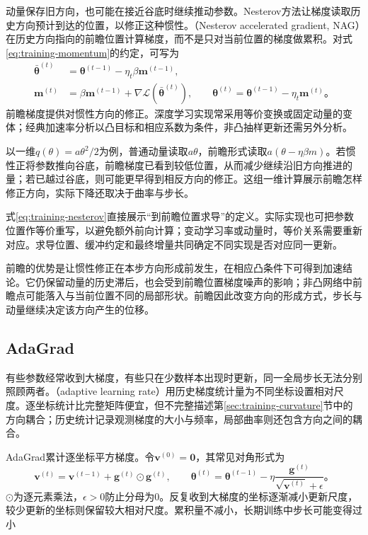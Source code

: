 动量保存旧方向，也可能在接近谷底时继续推动参数。Nesterov方法让梯度读取历史方向预计到达的位置，以修正这种惯性。（Nesterov accelerated gradient, NAG）在历史方向指向的前瞻位置计算梯度，而不是只对当前位置的梯度做累积。对式\eqref{eq:training-momentum}的约定，可写为
\begin{align}
  \bar{\bm\theta}^{(t)}&=\bm\theta^{(t-1)}-\eta_t\beta\bm m^{(t-1)},\\
  \bm m^{(t)}&=\beta\bm m^{(t-1)}+
       \nabla\mathcal L(\bar{\bm\theta}^{(t)}),\qquad
  \bm\theta^{(t)}=\bm\theta^{(t-1)}-\eta_t\bm m^{(t)}\text{。}
  \label{eq:training-nesterov}
\end{align}
前瞻梯度提供对惯性方向的修正。深度学习实现常采用等价变换或固定动量的变体；经典加速率分析以凸目标和相应系数为条件，非凸抽样更新还需另外分析。

以一维$q(\theta)=a\theta^2/2$为例，普通动量读取$a\theta$，前瞻形式读取$a(\theta-\eta\beta m)$。若惯性正将参数推向谷底，前瞻梯度已看到较低位置，从而减少继续沿旧方向推进的量；若已越过谷底，则可能更早得到相反方向的修正。这组一维计算展示前瞻怎样修正方向，实际下降还取决于曲率与步长。

式\eqref{eq:training-nesterov}直接展示“到前瞻位置求导”的定义。实际实现也可把参数位置作等价重写，以避免额外前向计算；变动学习率或动量时，等价关系需要重新对应。求导位置、缓冲约定和最终增量共同确定不同实现是否对应同一更新。

前瞻的优势是让惯性修正在本步方向形成前发生，在相应凸条件下可得到加速结论。它仍保留动量的历史滞后，也会受到前瞻位置梯度噪声的影响；非凸网络中前瞻点可能落入与当前位置不同的局部形状。前瞻因此改变方向的形成方式，步长与动量继续决定该方向产生的位移。

\subsection{AdaGrad}
\label{sec:training-adaptive}

有些参数经常收到大梯度，有些只在少数样本出现时更新，同一全局步长无法分别照顾两者。（adaptive learning rate）用历史梯度统计量为不同坐标设置相对尺度。逐坐标统计比完整矩阵便宜，但不完整描述第\ref{sec:training-curvature}节中的方向耦合；历史统计记录观测梯度的大小与频率，局部曲率则还包含方向之间的耦合。

AdaGrad累计逐坐标平方梯度。令$\bm v^{(0)}=\bm0$，其常见对角形式为
\begin{equation}
  \bm v^{(t)}=\bm v^{(t-1)}+\bm g^{(t)}\odot\bm g^{(t)},\qquad
  \bm\theta^{(t)}=\bm\theta^{(t-1)}-
  \eta\frac{\bm g^{(t)}}{\sqrt{\bm v^{(t)}}+\epsilon}\text{。}
  \label{eq:training-adagrad}
\end{equation}
$\odot$为逐元素乘法，$\epsilon>0$防止分母为0。反复收到大梯度的坐标逐渐减小更新尺度，较少更新的坐标则保留较大相对尺度。累积量不减小，长期训练中步长可能变得过小

